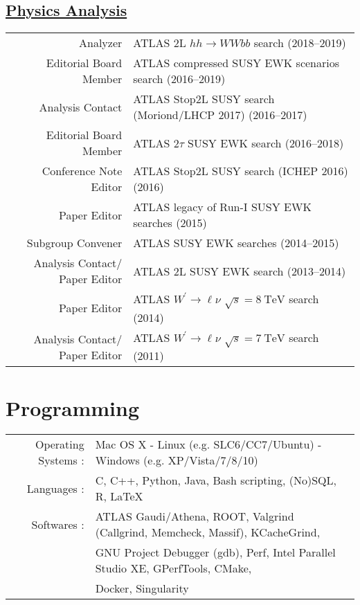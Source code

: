 \documentclass[a4paper,10pt]{article}
\begin{document}
\subsection{\underline{Physics Analysis}}
\vspace{1mm}
\begin{tabular}{r | p{12.5cm}}
\multicolumn{1}{r|}{Analyzer}					& ATLAS 2L $hh\rightarrow WWbb$ search \hfill (2018--2019)							\\
\multicolumn{1}{r|}{Editorial Board Member}		& ATLAS compressed SUSY EWK scenarios search \hfill (2016--2019)					\\
\multicolumn{1}{r|}{Analysis Contact}				& ATLAS Stop2L SUSY search (Moriond/LHCP 2017)  \hfill (2016--2017)					\\
\multicolumn{1}{r|}{Editorial Board Member}		& ATLAS 2$\tau$ SUSY EWK search \hfill (2016--2018)								\\
\multicolumn{1}{r|}{Conference Note Editor}		& ATLAS Stop2L SUSY search (ICHEP 2016) \hfill (2016)								\\
\multicolumn{1}{r|}{Paper Editor}				& ATLAS legacy of Run-I SUSY EWK searches \hfill (2015) 							\\ 
\multicolumn{1}{r|}{Subgroup Convener}			& ATLAS SUSY EWK searches \hfill (2014--2015)									\\
\multicolumn{1}{r|}{Analysis Contact/ Paper Editor}	& ATLAS 2L SUSY EWK search \hfill (2013--2014)									\\
\multicolumn{1}{r|}{Paper Editor}				& ATLAS $W^{\prime}\rightarrow\ell\nu$ $\sqrt{s} = 8\ \mathrm{TeV}$  search \hfill (2014)		\\
\multicolumn{1}{r|}{Analysis Contact/ Paper Editor}	& ATLAS $W^{\prime}\rightarrow\ell\nu$ $\sqrt{s} = 7\ \mathrm{TeV}$ search \hfill (2011)		\\
\end{tabular}

\section{Programming}
\begin{tabular}{rl}
Operating Systems : 		& Mac OS X - Linux (e.g. SLC6/CC7/Ubuntu) - Windows (e.g. XP/Vista/7/8/10) 	\\
Languages : 			& C, C++, Python, Java, Bash scripting, (No)SQL, R, \LaTeX				\\
Softwares : 			& ATLAS Gaudi/Athena, ROOT, Valgrind (Callgrind, Memcheck, Massif), KCacheGrind, \\ 
					& GNU Project Debugger (gdb), Perf, Intel\textsuperscript{\textregistered} Parallel Studio XE, GPerfTools, CMake, \\
					& Docker, Singularity \\
\end{tabular}
\end{document}
